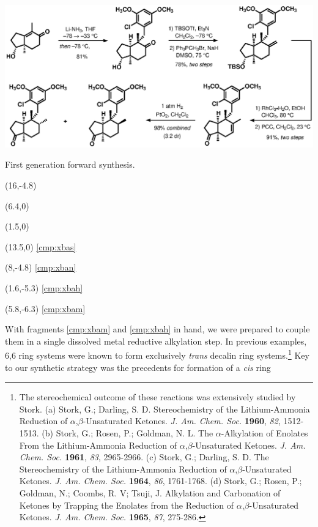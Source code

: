 \begin{Scheme}[t]
  \centering
  \includegraphics[scale=0.8]{chp_singlecarbon/images/forwardgenone}
  \caption{First generation forward synthesis.}
  \begin{textblock}{1}(16,-4.8)  \end{textblock}
  \begin{textblock}{1}(6.4,0)  \end{textblock}
  \begin{textblock}{1}(1.5,0)  \end{textblock}
    \begin{textblock}{1}(13.5,0) \textsf{\scriptsize{\ref{cmp:xbas}}}
\end{textblock}
  \begin{textblock}{1}(8,-4.8) \textsf{\scriptsize{\ref{cmp:xban}}}
\end{textblock}
    \begin{textblock}{1}(1.6,-5.3) \textsf{\scriptsize{\ref{cmp:xbah}}}
\end{textblock}
  \begin{textblock}{1}(5.8,-6.3) \textsf{\scriptsize{\ref{cmp:xbam}}}
\end{textblock}
  \label{sch:forwardgenone}
\end{Scheme}
With fragments \ref{cmp:xbam} and \ref{cmp:xbah} in hand, we were prepared
to couple them in a single dissolved metal reductive alkylation step. In previous
examples, 6,6 ring systems were known to form exclusively \textit{trans} decalin
ring systems.\footnote{The stereochemical outcome of these reactions was extensively studied by
Stork. (a) {\frenchspacing Stork, G.; Darling, S. D. Stereochemistry of the Lithium-Ammonia
Reduction of $\alpha$,$\beta$-Unsaturated Ketones. \textit{J. Am. Chem. Soc.} \textbf{1960},
\textit{82}, 1512-1513.} (b) {\frenchspacing Stork, G.; Rosen, P.; Goldman, N. L. The
$\alpha$-Alkylation of Enolates From the Lithium-Ammonia Reduction of $\alpha$,$\beta$-Unsaturated
Ketones. \textit{J. Am. Chem. Soc.} \textbf{1961}, \textit{83}, 2965-2966.} (c) {\frenchspacing
Stork, G.; Darling, S. D. The Stereochemistry of the Lithium-Ammonia Reduction of
$\alpha$,$\beta$-Unsaturated Ketones. \textit{J. Am. Chem. Soc.} \textbf{1964}, \textit{86},
1761-1768.} (d) {\frenchspacing Stork, G.; Rosen, P.; Goldman, N.; Coombs, R. V; Tsuji, J.
Alkylation and Carbonation of Ketones by Trapping the Enolates from the Reduction of
$\alpha$,$\beta$-Unsaturated Ketones. \textit{J. Am. Chem. Soc.} \textbf{1965}, \textit{87},
275-286.}} Key to our synthetic strategy was the precedents for formation of a \textit{cis} ring
